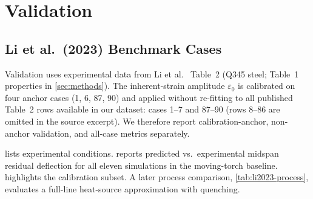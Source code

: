 \section{Validation}
\label{sec:validation}

\subsection{Li et al.\ (2023) Benchmark Cases}
Validation uses experimental data from Li et al.\ \cite{li2023} Table~2 (Q345 steel; Table~1 properties in \cref{sec:methods}). The inherent-strain amplitude $\varepsilon_0$ is calibrated on four anchor cases (1, 6, 87, 90) and applied without re-fitting to all published Table~2 rows available in our dataset: cases 1--7 and 87--90 (rows 8--86 are omitted in the source excerpt). We therefore report calibration-anchor, non-anchor validation, and all-case metrics separately.

 lists experimental conditions.  reports predicted vs.\ experimental midspan residual deflection for all eleven simulations in the moving-torch baseline.  highlights the calibration subset. A later process comparison, \cref{tab:li2023-process}, evaluates a full-line heat-source approximation with quenching.


